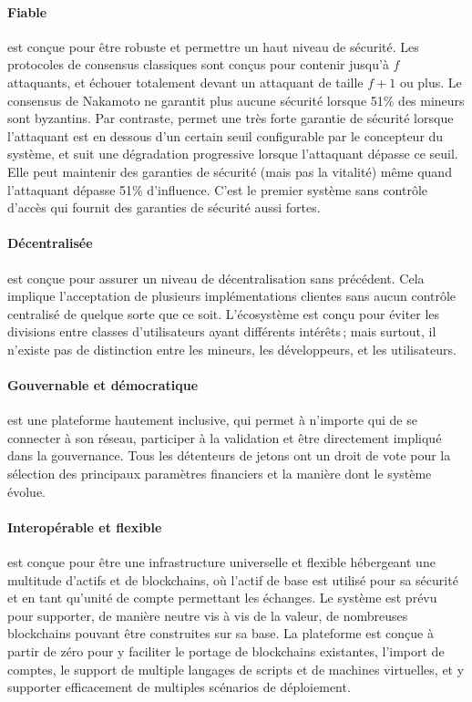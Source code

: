 \documentclass[runningheads,francais,a4paper]{llncs}
\begin{document}
\paragraph{Fiable} \AVAPlatformName{} est conçue pour être robuste et permettre un haut niveau de sécurité. Les
protocoles de consensus classiques sont conçus pour contenir jusqu'à $f$ attaquants, et échouer totalement devant
un attaquant de taille $f+1$ ou plus. Le consensus de Nakamoto ne garantit plus aucune sécurité lorsque 51\% des
mineurs sont byzantins. Par contraste, \AVAPlatformName{} permet une très forte garantie de sécurité lorsque l'attaquant
est en dessous d'un certain seuil configurable par le concepteur du système, et suit une dégradation progressive lorsque
l'attaquant dépasse ce seuil. Elle peut maintenir des garanties de sécurité (mais pas la vitalité) même quand
l'attaquant dépasse 51\% d'influence. C'est le premier système sans contrôle d'accès qui fournit des garanties de
sécurité aussi fortes.

\paragraph{Décentralisée} \AVAPlatformName{} est conçue pour assurer un niveau de décentralisation sans précédent. Cela
implique l'acceptation de plusieurs implémentations clientes sans aucun contrôle centralisé de quelque sorte que ce soit.
L'écosystème est conçu pour éviter les divisions entre classes d'utilisateurs ayant différents intérêts\,; mais surtout,
il n'existe pas de distinction entre les mineurs, les développeurs, et les utilisateurs.

\paragraph{Gouvernable et démocratique} \AVAPlatformName{} est une plateforme hautement inclusive, qui permet à
n'importe qui de se connecter à son réseau, participer à la validation et être directement impliqué dans la
gouvernance. Tous les détenteurs de jetons ont un droit de vote pour la sélection des principaux paramètres financiers
et la manière dont le système évolue.

\paragraph{Interopérable et flexible} \AVAPlatformName{} est conçue pour être une infrastructure universelle et flexible
hébergeant une multitude d'actifs et de blockchains, où l'actif de base \AVATokenName{} est utilisé pour sa sécurité
et en tant qu'unité de compte permettant les échanges. Le système est prévu pour supporter, de manière neutre vis à vis
de la valeur, de nombreuses blockchains pouvant être construites sur sa base. La plateforme est conçue à partir de zéro
pour y faciliter le portage de blockchains existantes, l'import de comptes, le support de multiple langages de scripts
et de machines virtuelles, et y supporter efficacement de multiples scénarios de déploiement.
\end{document}
